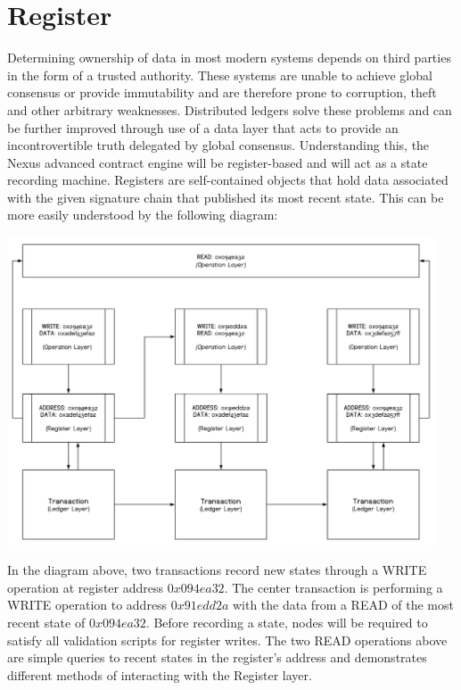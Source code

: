 \documentclass[11pt]{article}
\begin{document}
\section{Register}

\noindent Determining ownership of data in most modern systems depends on third parties in the form of a trusted authority. 
These systems are unable to achieve global consensus or provide immutability and are therefore prone to corruption, theft and other arbitrary weaknesses. 
Distributed ledgers solve these problems and can be further improved through use of a data layer that acts to provide an incontrovertible truth delegated by global consensus.
Understanding this, the Nexus advanced contract engine will be register-based and will act as a state recording machine.
Registers are self-contained objects that hold data associated with the given signature chain that published its most recent state.
This can be more easily understood by the following diagram:

\hspace{-25pt}
\includegraphics[width=0.95\textwidth]{./images/rsz_registers.png}

\noindent In the diagram above, two transactions record new states through a WRITE operation at register address $0x094ea32$.
The center transaction is performing a WRITE operation to address $0x91edd2a$ with the data from a READ of the most recent state of $0x094ea32$.
Before recording a state, nodes will be required to satisfy all validation scripts for register writes.
The two READ operations above are simple queries to recent states in the register's address and demonstrates different methods of interacting with the Register layer.
\end{document}
